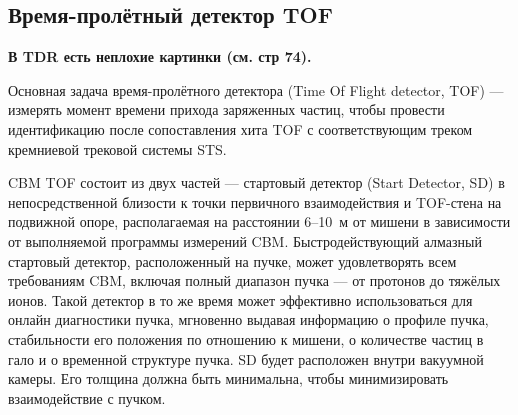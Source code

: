 \subsection{Время-пролётный детектор TOF}\label{sec:secTOF}

\textbf{В TDR есть неплохие картинки (см. стр 74).}


Основная задача время-пролётного детектора (Time Of Flight detector, TOF) --- измерять момент времени прихода заряженных частиц, чтобы провести идентификацию после сопоставления хита TOF с соответствующим треком кремниевой трековой системы STS.


CBM TOF состоит из двух частей --- стартовый детектор (Start Detector, SD) в непосредственной близости к точки первичного взаимодействия и TOF-стена на подвижной опоре, располагаемая на расстоянии 6--10~м от мишени в зависимости от выполняемой программы измерений CBM. Быстродействующий алмазный стартовый детектор, расположенный на пучке, может удовлетворять всем требованиям CBM, включая полный диапазон пучка --- от протонов до тяжёлых ионов. Такой детектор в то же время может эффективно использоваться для онлайн диагностики пучка, мгновенно выдавая информацию о профиле пучка, стабильности его положения по отношению к мишени, о количестве частиц в гало и о временной структуре пучка. SD будет расположен внутри вакуумной камеры. Его толщина должна быть минимальна, чтобы минимизировать взаимодействие с пучком.

